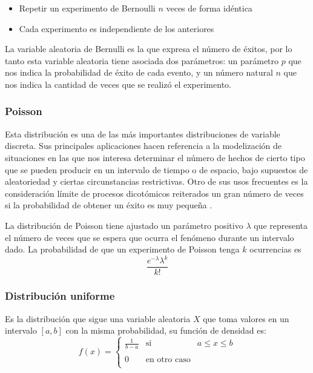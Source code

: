 \documentclass[
  12pt,
]{krantz}
\theoremstyle{definition}
\theoremstyle{definition}
\theoremstyle{definition}
\theoremstyle{remark}
\begin{document}
\begin{itemize}
\item
  Repetir un experimento de Bernoulli \(n\) veces de forma idéntica
\item
  Cada experimento es independiente de los anteriores
\end{itemize}

La variable aleatoria de Bernulli es la que expresa el número de éxitos, por lo tanto esta variable aleatoria tiene asociada dos parámetros: un parámetro \(p\) que nos indica la probabilidad de éxito de cada evento, y un número natural \(n\) que nos indica la cantidad de veces que se realizó el experimento.

\hypertarget{poisson}{%
\subsubsection{Poisson}\label{poisson}}

Esta distribución es una de las más importantes distribuciones de variable discreta. Sus principales aplicaciones hacen referencia a la modelización de situaciones en las que nos interesa determinar el número de hechos de cierto tipo que se pueden producir en un intervalo de tiempo o de espacio, bajo supuestos de aleatoriedad y ciertas circunstancias restrictivas. Otro de sus usos frecuentes es la consideración límite de procesos dicotómicos reiterados un gran número de veces si la probabilidad de obtener un éxito es muy pequeña .

La distribución de Poisson tiene ajustado un parámetro positivo \(\lambda\) que representa el número de veces que se espera que ocurra el fenómeno durante un intervalo dado. La probabilidad de que un experimento de Poisson tenga \(k\) ocurrencias es \[\frac{e^{-\lambda}\lambda^k}{k!}\]

\hypertarget{distribucion-uniforme}{%
\subsubsection{Distribución uniforme}\label{distribucion-uniforme}}

Es la distribución que sigue una variable aleatoria \(X\) que toma valores en un intervalo \([a,b]\) con la misma probabilidad, su función de densidad es: \[f(x)= \left\{ \begin{array}{lcc}
             \frac{1}{b-a} &   \textrm{si}  & a \leq x \leq b \\
             \\ 0 &  \textrm{en otro caso} \\
             \end{array}
   \right.\]
\end{document}
